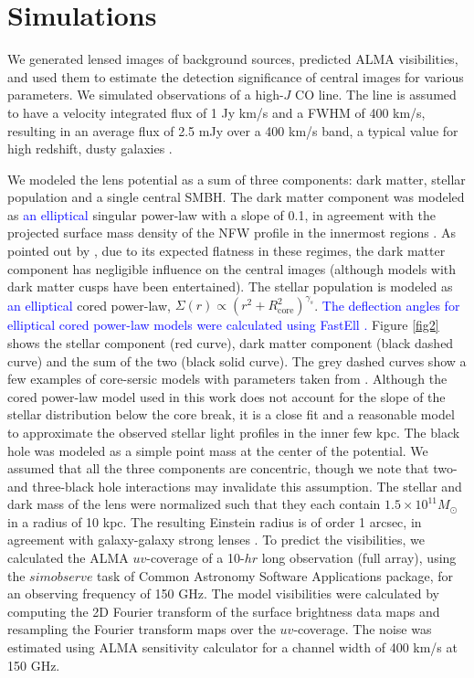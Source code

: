 \documentclass[chicago]{emulateapj}
\newcommand{\blue}{\textcolor{blue}}
\begin{document}
\section{Simulations}
We generated lensed images of background sources, predicted ALMA visibilities, and used them to estimate the detection significance of central images for various parameters. We simulated observations of a high-$J$ CO line. The line is assumed to have a velocity integrated flux of 1 Jy km/s and a FWHM of 400 km/s, resulting in an average flux of 2.5 mJy over a 400 km/s band, a typical value for high redshift, dusty galaxies \citep{Bothwell:12}. 

We modeled the lens potential as a sum of three components: dark matter, stellar population and a single central SMBH. The dark matter component was modeled as \blue{an elliptical} singular power-law with a slope of 0.1, in agreement with the projected surface mass density of the NFW profile in the innermost regions \citep{Golse:02}. As  pointed out by \citet{Keeton:03}, due to its expected flatness in these regimes, the dark matter component has negligible influence on the central images (although models with dark matter cusps have been entertained). 
The stellar population is modeled as \blue{an elliptical} cored power-law, $\Sigma(r)\propto (r^2+R_{\mathrm{core}}^2)^{\gamma_s}$. \blue{The deflection angles for elliptical cored power-law models were calculated using FastEll \citep{Barkana:98}.}  Figure \ref{fig2} shows the stellar component (red curve), dark matter component (black dashed curve) and the sum of the two (black solid curve). The grey dashed curves show a few examples of core-sersic models with parameters taken from \citet{Ferrarese:06}. Although the cored power-law model used in this work does not account for the slope of the stellar distribution below the core break, it is a close fit and a reasonable model to approximate the observed stellar light profiles in the inner few kpc. 
The black hole was modeled as a simple point mass at the center of the potential. We assumed that all the three components are concentric, though we note that two- and three-black hole interactions may invalidate this assumption.
The stellar and dark mass of the lens were normalized such that they each contain $1.5\times10^{11} M_{\odot}$ in a radius of 10 kpc. The resulting Einstein radius is of order 1 arcsec, in agreement with galaxy-galaxy strong lenses \citep[e.g.,][]{hezaveh:13b}.
To predict the visibilities, we calculated the ALMA $uv$-coverage of a 10-$hr$ long observation (full array), using the $simobserve$ task of Common Astronomy Software Applications package, for an observing frequency of 150 GHz. 
The model visibilities were calculated by computing the 2D Fourier transform of the surface brightness data maps and resampling the Fourier transform maps over the $uv$-coverage. 
The noise was estimated using ALMA sensitivity calculator for a channel width of 400 km/s at 150 GHz. 
\end{document}
